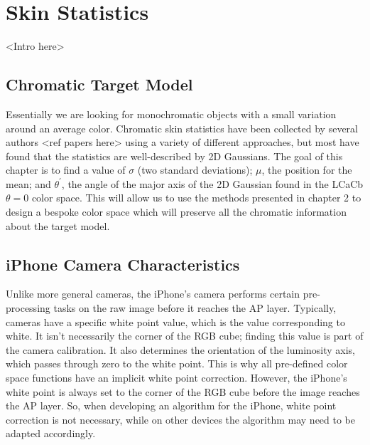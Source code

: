 
\chapter{Skin Statistics}\label{sec:ChapSkin}
\ifpdf
    \graphicspath{{Chapter3/Figs/Raster/}{Chapter3/Figs/PDF/}{Chapter3/Figs/}}
\else
    \graphicspath{{Chapter3/Figs/Vector/}{Chapter3/Figs/}}
\fi


<Intro here>

\section{Chromatic Target Model}

Essentially we are looking for monochromatic objects with a small variation around an average color. Chromatic skin statistics have been collected by several authors <ref papers here> using a variety of different approaches, but most have found that the statistics are well-described by 2D Gaussians. The goal of this chapter is to find a value of $\sigma$ (two standard deviations); $\mu$, the position for the mean; and $\theta^\prime$, the angle of the major axis of the 2D Gaussian found in the LCaCb $\theta = 0$ color space. This will allow us to use the methods presented in chapter 2 to design a bespoke color space which will preserve all the chromatic information about the target model.

\section{iPhone Camera Characteristics} \label{sec:iPhoneCameraCharacteristics}

Unlike more general cameras, the iPhone's camera performs certain pre-processing tasks on the raw image before it reaches the AP layer. Typically, cameras have a specific white point value, which is the value corresponding to white. It isn't necessarily the corner of the RGB cube; finding this value is part of the camera calibration. It also determines the orientation of the luminosity axis, which passes through zero to the white point. This is why all pre-defined color space functions have an implicit white point correction. However, the iPhone's white point is always set to the corner of the RGB cube before the image reaches the AP layer. So, when developing an algorithm for the iPhone, white point correction is not necessary, while on other devices the algorithm may need to be adapted accordingly.

